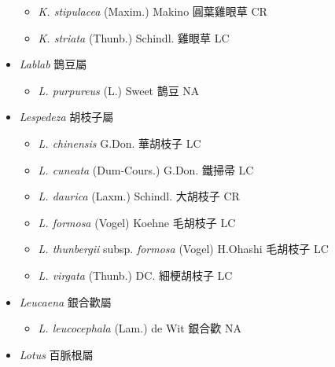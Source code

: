 \begin{itemize}
  \begin{itemize}
        \item[] \textit{K. stipulacea} (Maxim.) Makino  圓葉雞眼草   CR
        \item[] \textit{K. striata} (Thunb.) Schindl.  雞眼草   LC
  \end{itemize}
 \item[] \textit{Lablab} 鵲豆屬
                                
  \begin{itemize}
        \item[] \textit{L. purpureus} (L.) Sweet  鵲豆   NA
  \end{itemize}
 \item[] \textit{Lespedeza} 胡枝子屬
                                
  \begin{itemize}
        \item[] \textit{L. chinensis} G.Don.  華胡枝子   LC
        \item[] \textit{L. cuneata} (Dum-Cours.) G.Don.  鐵掃帚   LC
        \item[] \textit{L. daurica} (Laxm.) Schindl.  大胡枝子   CR
        \item[] \textit{L. formosa} (Vogel) Koehne  毛胡枝子   LC
        \item[] \textit{L. thunbergii} subsp. \textit{formosa} (Vogel) H.Ohashi  毛胡枝子   LC
        \item[] \textit{L. virgata} (Thunb.) DC.  細梗胡枝子   LC
  \end{itemize}
 \item[] \textit{Leucaena} 銀合歡屬
                                
  \begin{itemize}
        \item[] \textit{L. leucocephala} (Lam.) de Wit  銀合歡   NA
  \end{itemize}
 \item[] \textit{Lotus} 百脈根屬
                                

\end{itemize}
